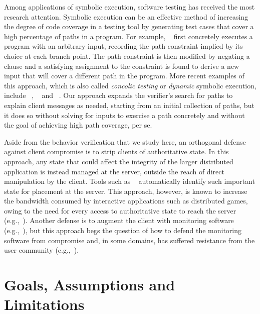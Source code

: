 {Among applications of symbolic execution, software testing has
received the most research attention. Symbolic execution can be an
effective method of increasing the degree of code coverage in a
testing tool by generating test cases that cover a high percentage of
paths in a program.  For example, \dart~\cite{godefroid05:dart} first
concretely executes a program with an arbitrary input, recording the
path constraint implied by its choice at each branch point.  The path
constraint is then modified by negating a clause and a satisfying
assignment to the constraint is found to derive a new input that will
cover a different path in the program. More recent examples of this
approach, which is also called {\em concolic testing} or {\em dynamic}
symbolic execution, include \cute~\cite{sen05:cute},
\jpf~\cite{visser04:tig} and
\pex~\cite{tillmann08:pex,anand08:demand}.  Our approach expands the
verifier's search for paths to explain client messages as needed,
starting from an initial collection of paths, but it does so without
solving for inputs to exercise a path concretely and without the goal
of achieving high path coverage, per se.

Aside from the behavior verification that we study here, an
orthogonal defense against client compromise is to strip clients of
authoritative state.  In this approach, any state that could affect
the integrity of the larger distributed application is instead managed
at the server, outside the reach of direct manipulation by the client.
Tools such as \swift~\cite{chong07:swift} automatically identify such
important state for placement at the server.  This approach, however,
is known to increase the bandwidth consumed by interactive
applications such as distributed games, owing to the need for every
access to authoritative state to reach the server
(e.g.,~\cite[p.~112]{mulligan03:guide}).  Another defense is to
augment the client with monitoring software
(e.g.,~\cite{delap04:verification,monch06:protecting,schluessler07:bot,feng08:stealth,kaiser09:fides}),
but this approach begs the question of how to defend the monitoring
software from compromise and, in some domains, has suffered resistance
from the user community (e.g.,~\cite{ward05:warcraft}).
}


\section{Goals, Assumptions and Limitations}
\label{sec:guided:goals}

